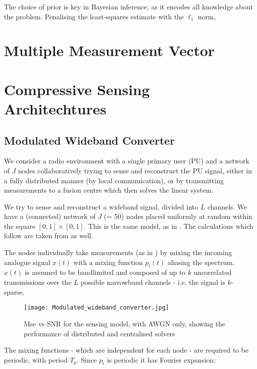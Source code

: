 The choice of prior is key in Bayesian inference, as it encodes all knowledge about the problem. Penalising the least-squares estimate  with the \(\ell_1\) norm,

\section{Multiple Measurement Vector} \label{sec:mmv}

\section{Compressive Sensing Architechtures}\label{sec:sensingmodel}

\subsection{Modulated Wideband Converter}
We consider a radio environment with a single primary user (PU) and a network of \(J\) nodes collaboratively trying to sense and reconstruct the PU signal, either in a fully distributed manner (by local communication), or by transmitting measurements to a fusion centre which then solves the linear system. 

We try to sense and reconstruct a wideband signal, divided into \(L\) channels. We have a (connected) network of \(J\) (= 50) nodes placed uniformly at random within the square \(  \left[0,1\right]\times \left[0,1\right] \). This is the same model, as in \cite{Zhang2011b}. The calculations which follow are taken from \cite{Zhang2011b} as well.

The nodes individually take measurements (as in \cite{mishali2010theory}) by mixing the incoming analogue signal \(x\left(t\right)\) with a mixing function \(p_i\left(t\right)\) aliasing the spectrum. \(x\left(t\right)\) is assumed to be bandlimited and composed of up to \(k\) uncorrelated transmissions over the \(L\) possible narrowband channels - i.e. the signal is \(k\)-sparse. 

\begin{figure}[h]
\centering
\texttt{[image: Modulated\_wideband\_converter.jpg]}
\caption{Mse vs SNR for the sensing model, with AWGN only, showing the performance of distributed and centralised solvers}
\label{msevssnr0}
\end{figure}

The mixing functions - which are independent for each node - are required to be periodic, with period \(T_p\). Since \(p_i\) is periodic it has Fourier expansion:

